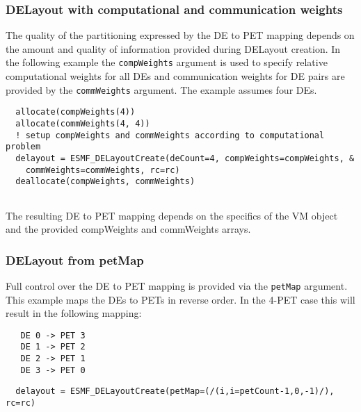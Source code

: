    \subsubsection{DELayout with computational and communication weights}
   
   The quality of the partitioning expressed by the DE to PET mapping depends
   on the amount and quality of information provided during DELayout creation.
   In the following example the {\tt compWeights} argument is used to specify
   relative computational weights for all DEs and communication weights for
   DE pairs are provided by the {\tt commWeights} argument. The example assumes
   four DEs. 

 \begin{verbatim}
  allocate(compWeights(4))
  allocate(commWeights(4, 4))
  ! setup compWeights and commWeights according to computational problem
  delayout = ESMF_DELayoutCreate(deCount=4, compWeights=compWeights, &
    commWeights=commWeights, rc=rc)
  deallocate(compWeights, commWeights)
 
\end{verbatim}
 

   The resulting DE to PET mapping depends on the specifics of the VM object and
   the provided compWeights and commWeights arrays. 

   \subsubsection{DELayout from petMap}
   
   Full control over the DE to PET mapping is provided via the {\tt petMap}
   argument. This example maps the DEs to PETs in reverse order. In the 4-PET
   case this will result in the following mapping:
   \begin{verbatim}
   DE 0 -> PET 3
   DE 1 -> PET 2
   DE 2 -> PET 1
   DE 3 -> PET 0
   \end{verbatim} 

 \begin{verbatim}
  delayout = ESMF_DELayoutCreate(petMap=(/(i,i=petCount-1,0,-1)/), rc=rc)
 
\end{verbatim}
 

